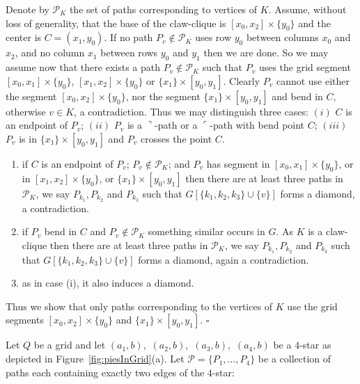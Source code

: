 \documentclass[9pt]{entcs}
\newtheorem{defi}{Definition}[section]
\begin{document}
\begin{pf}
Denote by $\mathcal{P}_K$ the set of paths corresponding to vertices of $K$. 
Assume, without loss of generality, that the base of the claw-clique is $[x_0, x_2] \times \{y_0\}$ and the center is $C = (x_1 , y_0)$. If no path $P_v \notin \mathcal{P}_K$ uses row $y_0$ between columns $x_0$ and $x_2$, and no column $x_1$ between rows $y_0$ and $y_1$ then we
are done. So we may assume now that there exists a path $P_v \notin \mathcal{P}_K$ such that $P_v$ uses the grid segment $[x_0, x_1] \times \{y_0\}$, $[x_1, x_2] \times \{y_0\}$ or  $\{x_1\} \times [y_0, y_1]$.  Clearly $P_v$ cannot use either the segment $[x_0, x_2] \times \{y_0\}$, nor the segment $\{x_1\} \times [y_0, y_1]$ and bend in $C$, otherwise $v \in K$, a contradiction. Thus we may distinguish three cases: $(i)$ $C$ is an endpoint of $P_v$; $(ii)$ $P_v$ is a ${\urcorner} $-path or a ${\ulcorner} $-path with bend point $C$; $(iii)$ $P_v$ is in $\{x_1\} \times [y_0, y_1]$ and $P_v$ crosses the point $C$.  

\begin{enumerate}[label=(\roman*)]
    \item if $C$ is an endpoint of $P_v$; $P_v \notin \mathcal{P}_K$; and $P_v$ has segment in  $[x_0, x_1] \times \{y_0\}$, or in $[x_1, x_2] \times \{y_0\}$, or $\{x_1\} \times [y_0, y_1]$ then there are at least three paths in $\mathcal{P}_K$, we say $P_{k_1}, P_{k_2}$ and $P_{k_3}$ such that $G[\{k_1, k_2, k_3\}\cup \{v\}]$ forms a diamond, a contradiction.
    \item if $P_v$ bend in $C$ and $P_v \notin \mathcal{P}_K$ something similar occurs in $G$. As $K$ is a claw-clique then there are at least three paths in $\mathcal{P}_K$, we say $P_{k_1}, P_{k_2}$ and $P_{k_3}$ such that $G[\{k_1, k_2, k_3\}\cup \{v\}]$ forms a diamond, again a contradiction.
    \item as in case (i), it also induces a diamond. 
\end{enumerate}
Thus we show that only paths corresponding to the vertices of $K$ use the grid segments $[x_0, x_2]\times\{y_ 0\}$ and $\{x_1\}\times[y_ 0, y_ 1]$.
$\square$
\end{pf}



Let $ Q $ be a grid and let $ (a_1, b),$ $(a_2, b),$ $(a_3, b),$ $(a_4, b)$ be a $4$-star as depicted in Figure~\ref{fig:piesInGrid}(a). Let $ \mathcal{P} = \{P_1, \dots , P_4\}$ be a collection of paths each containing exactly two edges of the $4$-star:
\end{document}
